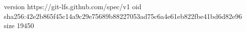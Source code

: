 version https://git-lfs.github.com/spec/v1
oid sha256:42e2b865f45c14a9c29e75689b88227053ad75c6a4e61eb822fbe41bd6d82e96
size 19450
